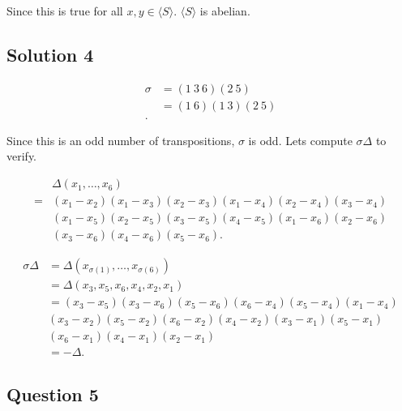 Since this is true for all \( x,y \in \langle S \rangle \). \( \langle S \rangle \) is abelian.



\subsection{Solution 4}
\begin{align*}
  \sigma &= \left( 1 \: 3 \: 6 \right) \left( 2 \: 5 \right) \\
  &= \left( 1 \: 6 \right) \left( 1 \: 3 \right) \left( 2 \: 5 \right) \\
.\end{align*}

Since this is an odd number of transpositions, \( \sigma  \) is odd. 
Lets compute \( \sigma \Delta\) to verify.

\begin{align*}
  & \Delta \left(x_{1}, \ldots,x_{6}  \right)  \\
  = &\left(x_{1} - x_{2}\right) \left( x_{1} - x_{3} \right) \left( x_{2} - x_{3} \right) \left( x_{1} - x_{4} \right) \left( x_{2} - x_{4} \right) \left( x_{3} - x_{4} \right) \\
    & \left( x_{1} - x_{5} \right) \left( x_{2} - x_{5}   \right) \left( x_{3} - x_{5} \right) \left( x_{4} - x_{5} \right) \left(x_{1} - x_{6}  \right) \left( x_{2} - x_{6} \right) \\
    & \left( x_{3} - x_{6} \right) \left( x_{4} - x_{6} \right) \left( x_{5} - x_{6} \right)
.\end{align*}

\begin{align*}
  \sigma \Delta &= \Delta \left( x_{\sigma(1)}, \ldots, x_{\sigma(6)} \right) \\
  &= \Delta \left( x_{3}, x_{5}, x_{6}, x_{4}, x_{2}, x_{1}\right) \\
  &= \left(x_{3} - x_{5}\right) \left( x_{3} - x_{6} \right) \left( x_{5} - x_{6} \right) \left( x_{6} - x_{4} \right) \left( x_{5} - x_{4} \right) \left( x_{1} - x_{4} \right) \\
    & \left( x_{3} - x_{2} \right) \left( x_{5} - x_{2}   \right) \left( x_{6} - x_{2} \right) \left( x_{4} - x_{2} \right) \left(x_{3} - x_{1}  \right) \left( x_{5} - x_{1} \right) \\
    & \left( x_{6} - x_{1} \right) \left( x_{4} - x_{1} \right) \left( x_{2} - x_{1} \right) \\
  &= - \Delta 
.\end{align*}

\subsection{Question 5}
